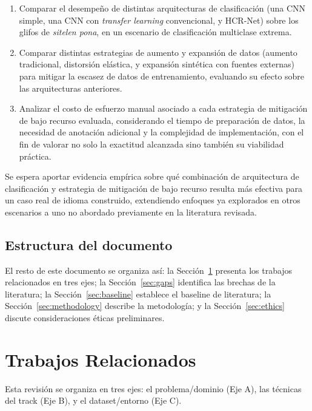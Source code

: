 \documentclass[conference]{IEEEtran}
\begin{document}
\begin{enumerate}
  \item Comparar el desempeño de distintas arquitecturas de clasificación
  (una CNN simple, una CNN con \textit{transfer learning} convencional, y
  HCR-Net) sobre los glifos de \textit{sitelen pona}, en un escenario de
  clasificación multiclase extrema.
  \item Comparar distintas estrategias de aumento y expansión de datos
  (aumento tradicional, distorsión elástica, y expansión sintética con
  fuentes externas) para mitigar la escasez de datos de entrenamiento, evaluando su efecto sobre las arquitecturas
  anteriores.
  \item Analizar el costo de esfuerzo manual asociado a cada estrategia de
  mitigación de bajo recurso evaluada, considerando el tiempo de
  preparación de datos, la necesidad de anotación adicional y la
  complejidad de implementación, con el fin de valorar no solo la
  exactitud alcanzada sino también su viabilidad práctica.
\end{enumerate}

Se espera aportar evidencia empírica sobre qué combinación de arquitectura de clasificación y estrategia de mitigación de bajo recurso resulta más efectiva para un caso real de idioma construido, extendiendo enfoques ya explorados en otros escenarios a uno no abordado previamente en la literatura revisada.

\subsection{Estructura del documento}
El resto de este documento se organiza así: la Sección~\ref{sec:related}
presenta los trabajos relacionados en tres ejes; la Sección~\ref{sec:gaps}
identifica las brechas de la literatura; la Sección~\ref{sec:baseline}
establece el baseline de literatura; la Sección~\ref{sec:methodology}
describe la metodología; y la Sección~\ref{sec:ethics}
discute consideraciones éticas preliminares.

\section{Trabajos Relacionados}
\label{sec:related}

Esta revisión se organiza en tres ejes: el problema/dominio (Eje A),
las técnicas del track (Eje B), y el dataset/entorno (Eje C).
\end{document}
